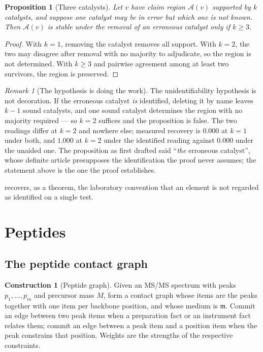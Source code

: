 \documentclass[11pt,a4paper]{article}
\newtheorem{proposition}[theorem]{Proposition}
\theoremstyle{definition}
\newtheorem{construction}[theorem]{Construction}
\theoremstyle{remark}
\newtheorem{remark}[theorem]{Remark}
\newcommand{\med}{\mathfrak{m}}              %
\newcommand{\amb}{\mathcal{A}}               %
\begin{document}
\begin{proposition}[Three catalysts]
\label{prop:three}
Let $v$ have claim region $\amb(v)$ supported by $k$ catalysts, and
suppose one catalyst may be in error \emph{but which one is not known}.
Then $\amb(v)$ is stable under the removal of \emph{an} erroneous
catalyst only if $k\ge3$.
\end{proposition}

\begin{proof}
With $k=1$, removing the catalyst removes all support. With $k=2$, the
two may disagree after removal with no majority to adjudicate, so the
region is not determined. With $k\ge3$ and pairwise agreement among at
least two survivors, the region is preserved.
\end{proof}

\begin{remark}[The hypothesis is doing the work]\label{rem:three-unaided}
The unidentifiability hypothesis is not decoration. If the erroneous
catalyst \emph{is} identified, deleting it by name leaves $k-1$ sound
catalysts, and one sound catalyst determines the region with no majority
required --- so $k=2$ suffices and the proposition is false. The two
readings differ at $k=2$ and nowhere else; measured recovery is
$0.000$ at $k=1$ under both, and $1.000$ at $k=2$ under the identified
reading against $0.000$ under the unaided one. The proposition as first
drafted said ``\emph{the} erroneous catalyst'', whose definite article
presupposes the identification the proof never assumes; the statement
above is the one the proof establishes.
\end{remark}

 recovers, as a theorem, the laboratory convention that
an element is not regarded as identified on a single test.

\section{Peptides}
\label{sec:peptide}

\subsection{The peptide contact graph}

\begin{construction}[Peptide graph]
\label{con:peptide}
Given an MS/MS spectrum with peaks $p_1,\dots,p_m$ and precursor mass
$M$, form a contact graph whose items are the peaks together with one
item per backbone position, and whose medium is $\med$. Commit an edge
between two peak items when a preparation fact or an instrument fact
relates them; commit an edge between a peak item and a position item
when the peak constrains that position. Weights are the strengths of the
respective constraints.
\end{construction}
\end{document}
